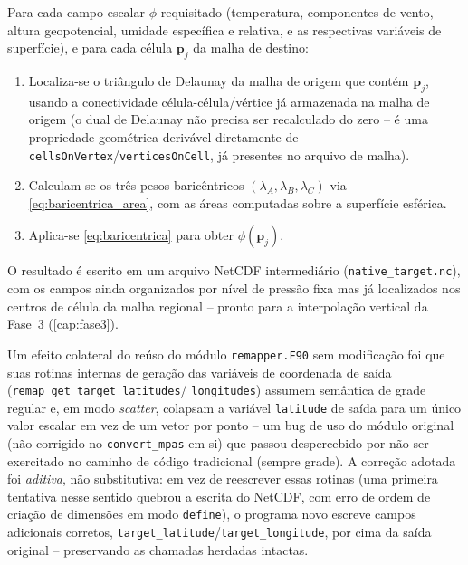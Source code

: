 Para cada campo escalar $\phi$ requisitado (temperatura, componentes de
vento, altura geopotencial, umidade específica e relativa, e as
respectivas variáveis de superfície), e para cada célula $\mathbf{p}_j$
da malha de destino:

\begin{enumerate}
  \item Localiza-se o triângulo de Delaunay da malha de origem que
    contém $\mathbf{p}_j$, usando a conectividade célula-célula/vértice
    já armazenada na malha de origem (o dual de Delaunay não precisa ser
    recalculado do zero -- é uma propriedade geométrica derivável
    diretamente de \texttt{cellsOnVertex}/\texttt{verticesOnCell}, já
    presentes no arquivo de malha).
  \item Calculam-se os três pesos baricêntricos $(\lambda_A, \lambda_B,
    \lambda_C)$ via \cref{eq:baricentrica_area}, com as áreas computadas
    sobre a superfície esférica.
  \item Aplica-se \cref{eq:baricentrica} para obter
    $\phi(\mathbf{p}_j)$.
\end{enumerate}

O resultado é escrito em um arquivo NetCDF intermediário
(\texttt{native\_target.nc}), com os campos ainda organizados por nível
de pressão fixa mas já localizados nos centros de célula da malha
regional -- pronto para a interpolação vertical da Fase~3
(\cref{cap:fase3}).

\begin{caixaachado}
Um efeito colateral do reúso do módulo \texttt{remapper.F90} sem
modificação foi que suas rotinas internas de geração das variáveis de
coordenada de saída (\texttt{remap\_get\_target\_latitudes}/
\texttt{longitudes}) assumem semântica de grade regular e, em modo
\emph{scatter}, colapsam a variável \texttt{latitude} de saída para um
único valor escalar em vez de um vetor por ponto -- um bug de uso do
módulo original (não corrigido no \texttt{convert\_mpas} em si) que
passou despercebido por não ser exercitado no caminho de código
tradicional (sempre grade). A correção adotada foi \emph{aditiva}, não
substitutiva: em vez de reescrever essas rotinas (uma primeira tentativa
nesse sentido quebrou a escrita do NetCDF, com erro de ordem de criação
de dimensões em modo \texttt{define}), o programa novo escreve campos
adicionais corretos, \texttt{target\_latitude}/\texttt{target\_longitude},
por cima da saída original -- preservando as chamadas herdadas intactas.
\end{caixaachado}

